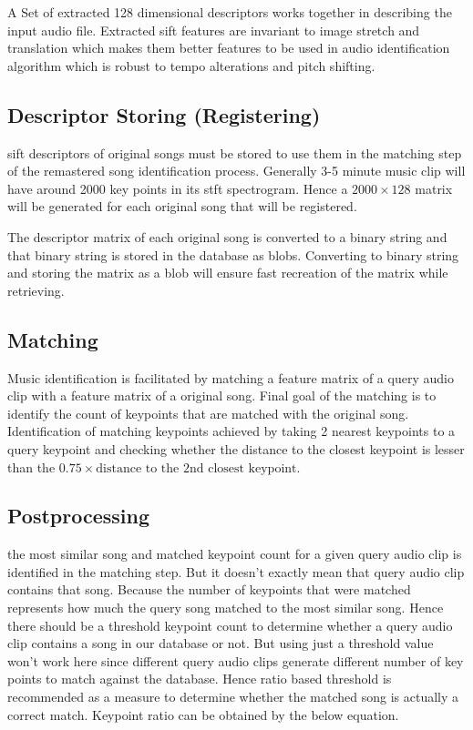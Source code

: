 A Set of extracted 128 dimensional descriptors works together in describing the input audio file. Extracted 
\gls{sift} features are invariant to image stretch and translation which makes them better features to be used
in audio identification algorithm which is robust to tempo alterations and pitch shifting. 

\subsection{Descriptor Storing (Registering)}
\gls{sift} descriptors of original songs must be stored to use them in the matching step of the remastered
song identification process. Generally 3-5 minute music clip will have around 2000 key points in its \gls{stft}
spectrogram. Hence a \(2000\times 128\) matrix will be generated for each original song that will be registered.

The descriptor matrix of each original song is converted to a binary string and that binary string is stored 
in the database as \gls{blob}s. Converting to binary string and storing the matrix as a \gls{blob} will ensure
fast recreation of the matrix while retrieving\cite{Sears2006}.   

\subsection{Matching}
Music identification is facilitated by matching a feature matrix of a query audio clip with a feature matrix of a original song. Final goal
of the matching is to identify the count of keypoints that are matched with the original song. Identification of matching keypoints achieved
by taking 2 nearest keypoints to a query keypoint and checking whether the distance to the closest keypoint is lesser than 
the \(0.75 \times \text{distance to the 2nd closest keypoint}\).

\subsection{Postprocessing}
the most similar song and matched keypoint count for a given query audio clip is identified in the matching step. But
it doesn't exactly mean that query audio clip contains that song. Because the number of keypoints that were matched
represents how much the query song matched to the most similar song. Hence there should be a threshold keypoint count
to determine whether a query audio clip contains a song in our database or not. But using just a threshold value 
won't work here since different query audio clips generate different number of key points to match against the
database. Hence ratio based threshold is recommended as a measure to determine whether the matched song is actually a
correct match. Keypoint ratio can be obtained by the below equation. 

